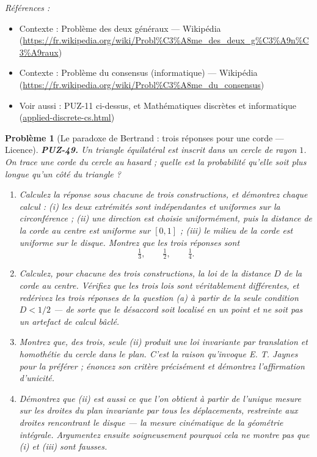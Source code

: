 \documentclass[11pt]{article}
\newtheorem{problem}{Problème}
\newenvironment{refs}{\par\small\noindent\emph{Références :}\begin{itemize}\setlength\itemsep{0pt}}{\end{itemize}\normalsize}
\begin{document}
\begin{refs}
\item Contexte : Problème des deux généraux --- Wikipédia (\url{https://fr.wikipedia.org/wiki/Probl%C3%A8me_des_deux_g%C3%A9n%C3%A9raux})
\item Contexte : Problème du consensus (informatique) --- Wikipédia (\url{https://fr.wikipedia.org/wiki/Probl%C3%A8me_du_consensus})
\item Voir aussi : PUZ-11 ci-dessus, et Mathématiques discrètes et informatique (\url{applied-discrete-cs.html})
\end{refs}

\bigskip

\begin{problem}[{Le paradoxe de Bertrand : trois réponses pour une corde --- Licence}]
\textbf{PUZ-49.} Un triangle équilatéral est inscrit dans un cercle de rayon $ 1 $. On
trace une corde du cercle \og{} au hasard \fg{} ; quelle est la probabilité qu'elle soit plus longue
qu'un côté du triangle ?
\begin{enumerate}
\item[(a)] Calculez la réponse sous chacune de trois constructions, et démontrez chaque calcul :
(i) les deux extrémités sont indépendantes et uniformes sur la circonférence ; (ii) une
direction est choisie uniformément, puis la distance de la corde au centre est uniforme sur
$ [0,1] $ ; (iii) le milieu de la corde est uniforme sur le disque. Montrez que les trois
réponses sont
\[ \tfrac{1}{3}, \qquad \tfrac{1}{2}, \qquad \tfrac{1}{4} . \]
\item[(b)] Calculez, pour chacune des trois constructions, la loi de la distance $ D $ de la
corde au centre. Vérifiez que les trois lois sont véritablement différentes, et redérivez
les trois réponses de la question (a) à partir de la seule condition $ D < 1/2 $ --- de
sorte que le désaccord soit localisé en un point et ne soit pas un artefact de calcul
bâclé.
\item[(c)] Montrez que, des trois, seule (ii) produit une loi invariante par translation et
homothétie du cercle dans le plan. C'est la raison qu'invoque E. T. Jaynes pour la préférer ;
énoncez son critère précisément et démontrez l'affirmation d'unicité.
\item[(d)] Démontrez que (ii) est aussi ce que l'on obtient à partir de l'unique mesure sur les
droites du plan invariante par tous les déplacements, restreinte aux droites rencontrant le
disque --- la mesure cinématique de la géométrie intégrale. Argumentez ensuite soigneusement
pourquoi cela ne montre \textit{pas} que (i) et (iii) sont fausses.
\end{enumerate}

\end{problem}
\end{document}
